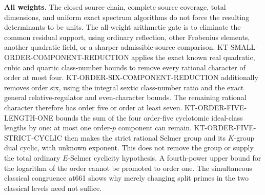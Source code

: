 \documentclass[11pt,a4paper]{article}
\theoremstyle{definition}
\renewcommand{\paragraph}[1]{\par\smallskip\noindent\textbf{#1}\quad\ignorespaces}
\begin{document}
\paragraph{All weights.}
The closed source chain, complete source coverage, total
dimensions, and uniform exact spectrum algorithms do not
force the resulting determinants to be units. The all-weight
arithmetic gate is to eliminate the common residual support,
using ordinary reflection, other Frobenius elements, another
quadratic field, or a sharper admissible-source comparison.
KT-SMALL-ORDER-COMPONENT-REDUCTION applies the exact known
real quadratic, cubic and quartic class-number bounds to
remove every rational character of order at most four.
KT-ORDER-SIX-COMPONENT-REDUCTION additionally removes order six,
using the integral sextic class-number ratio and the exact general
relative-regulator and even-character bounds.
The remaining rational character therefore has order five or
order at least seven. KT-ORDER-FIVE-LENGTH-ONE bounds the sum
of the four order-five cyclotomic ideal-class lengths by one:
at most one order-$p$ component can remain.
KT-ORDER-FIVE-STRICT-CYCLIC then makes the strict rational
Selmer group and its $K$-group dual cyclic, with unknown exponent.
This does not remove the group or supply the total ordinary
$E$-Selmer cyclicity hypothesis.
A fourth-power upper bound for the logarithm of the order
cannot be promoted to order one. The simultaneous classical
congruence at661 shows why merely changing split primes in
the two classical levels need not suffice.
\end{document}
